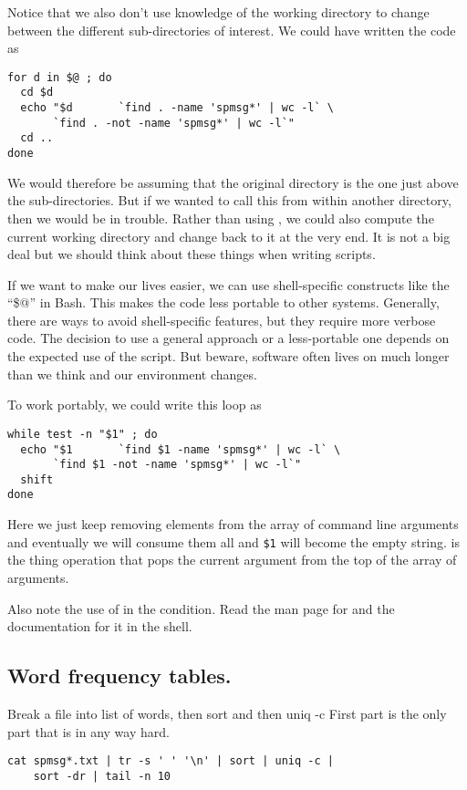 Notice that we also don't use knowledge of the working directory
to change between the different sub-directories of interest.
We could have written the code as
\begin{verbatim}
for d in $@ ; do
  cd $d
  echo "$d       `find . -name 'spmsg*' | wc -l` \
       `find . -not -name 'spmsg*' | wc -l`"
  cd ..
done
\end{verbatim}
We would therefore be assuming that the original directory is
the one just above  the sub-directories.
But if we wanted to call this from within another directory,
then we would be in trouble.
Rather than using , we could also compute the current
working directory and change back to it at the very end.
It is not a big deal but we should think about these
things when writing scripts.


If we want to make our lives easier,
we can use shell-specific constructs
like the ``\$@'' in Bash.
This makes the code less portable to other systems.
Generally, there are ways to avoid shell-specific
features, but they require more verbose code.
The decision to use a general approach or a less-portable
one depends on the expected use of the script.
But beware, software often lives on much longer than
we think and our environment changes.

To work portably, we could write this loop as
\begin{verbatim}
while test -n "$1" ; do
  echo "$1       `find $1 -name 'spmsg*' | wc -l` \
       `find $1 -not -name 'spmsg*' | wc -l`" 
  shift
done
\end{verbatim}
Here we just keep removing elements from the array of command line
arguments and eventually we will consume them all
and \verb+$1+ will become the empty string.
\shellKey{shift} is the thing operation that pops the current
argument from the top of the array of arguments.

Also note the use of  in the condition.
Read the man page for  and the documentation
for it in the shell.


\subsection{Word frequency tables.}
Break a file into list of words,
then sort and then  uniq -c
First part is the only part that is in any way hard.

\begin{verbatim}
cat spmsg*.txt | tr -s ' ' '\n' | sort | uniq -c | 
    sort -dr | tail -n 10
\end{verbatim}

